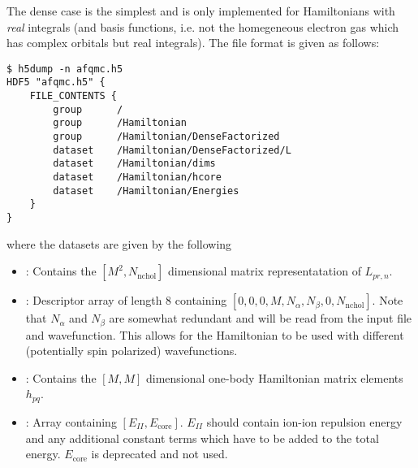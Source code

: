 The dense case is the simplest and is only implemented for Hamiltonians with \emph{real} integrals (and basis functions, i.e. not the homegeneous electron gas which has complex orbitals but real integrals).
The file format is given as follows:
\begin{lstlisting}[style=SHELL,caption=Sample Dense Cholesky QMCPACK Hamtiltonian.]
$ h5dump -n afqmc.h5
HDF5 "afqmc.h5" {
    FILE_CONTENTS {
        group      /
        group      /Hamiltonian
        group      /Hamiltonian/DenseFactorized
        dataset    /Hamiltonian/DenseFactorized/L
        dataset    /Hamiltonian/dims
        dataset    /Hamiltonian/hcore
        dataset    /Hamiltonian/Energies
    }
}
\end{lstlisting}
where the datasets are given by the following
\begin{itemize}
    \item {}: Contains the $[M^2,N_\mathrm{nchol}]$ dimensional matrix representatation of $L_{pr,n}$.
    \item {}: Descriptor array of length 8 containing $[0,0,0,M,N_\alpha,N_\beta,0,N_\mathrm{nchol}]$. Note that $N_\alpha$ and $N_\beta$ are somewhat redundant and will be read from the input file and wavefunction. This allows for the Hamiltonian to be used with different (potentially spin polarized) wavefunctions.
    \item {}: Contains the $[M,M]$ dimensional one-body Hamiltonian matrix elements $h_{pq}$.
    \item {}: Array containing $[E_{II}, E_{\mathrm{core}}]$. $E_{II}$ should contain ion-ion repulsion energy and any additional constant terms which have to be added to the total energy. $E_{\mathrm{core}}$ is deprecated and not used.
\end{itemize}

